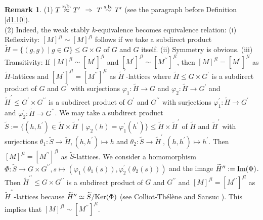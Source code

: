 \documentclass{amsart}
\theoremstyle{plain}
\theoremstyle{definition}
\newtheorem{remark}[theorem]{Remark}
\theoremstyle{remark}
\newcounter{sub}\def\tr{\mbox{tr }}
\begin{document}
%
\begin{remark}\label{r1.11}
(1) $T\stackrel{\rm s.b.}{\approx} T^\prime$ $\Rightarrow$ 
$T\stackrel{\rm s.b.}{\sim} T^\prime$ 
(see the paragraph before Definition \ref{d1.10}).\\
%
(2) 
Indeed, the weak stably $k$-equivalence becomes 
equivalence relation: 
(i) Reflexivity: $[M]^{fl}\sim [M]^{fl}$ follows 
if we take a subdirect product 
$\widetilde{H}=\{(g,g)\mid g\in G\}\leq G\times G$ of $G$ and $G$ itself. 
(ii) Symmetry is obvious. 
(iii) Transitivity: 
If $[M]^{fl}\sim [M^\prime]^{fl}$ and 
$[M^\prime]^{fl}\sim [M^{\prime\prime}]^{fl}$, 
then $[M]^{fl}=[M^\prime]^{fl}$ as $\widetilde{H}$-lattices 
and $[M^\prime]^{fl}=[M^{\prime\prime}]^{fl}$ 
as $\widetilde{H}^\prime$-lattices 
where $\widetilde{H}\leq G\times G^\prime$ is 
a subdirect product of $G$ and $G^\prime$ 
with surjections 
$\varphi_1:\widetilde{H}\rightarrow G$ and 
$\varphi_2:\widetilde{H}\rightarrow G^\prime$ 
and  
$\widetilde{H}^\prime\leq G^\prime\times G^{\prime\prime}$ is 
a subdirect product of $G^\prime$ and $G^{\prime\prime}$ 
with surjections 
$\varphi^\prime_1:\widetilde{H}\rightarrow G^\prime$ and 
$\varphi^\prime_2:\widetilde{H}\rightarrow G^{\prime\prime}$. 
We may take a subdirect product 
$\widetilde{S}:=\{(h,h^\prime)\in\widetilde{H}\times\widetilde{H}^\prime\mid 
\varphi_2(h)=\varphi^\prime_1(h^\prime)\}\leq \widetilde{H}\times\widetilde{H}^\prime$ of $\widetilde{H}$ and $\widetilde{H}^\prime$ 
with surjections 
$\theta_1: \widetilde{S}\rightarrow \widetilde{H}, (h,h^\prime)\mapsto h$ and 
$\theta_2: \widetilde{S}\rightarrow \widetilde{H}^\prime, (h,h^\prime)\mapsto h^\prime$. 
Then 
$[M]^{fl}=[M^{\prime\prime}]^{fl}$ as $\widetilde{S}$-lattices. 
We consider a homomorphism 
$\Phi: \widetilde{S}\rightarrow G\times G^{\prime\prime}, 
s\mapsto (\varphi_1(\theta_1(s)),\varphi_2^\prime(\theta_2(s)))$ 
and the image $\widetilde{H}^{\prime\prime}:={\rm Im}(\Phi)$. 
Then $\widetilde{H}^{\prime\prime}\leq G\times G^{\prime\prime}$ 
is a subdirect product of $G$ and $G^{\prime\prime}$ 
and $[M]^{fl}=[M^{\prime\prime}]^{fl}$ as 
$\widetilde{H}^{\prime\prime}$-lattices because 
$\widetilde{H}^{\prime\prime}\simeq \widetilde{S}/{\rm Ker}(\Phi)$
(see Colliot-Th\'el\`ene and Sansuc \cite[Lemme 2 (i), (ix)]{CTS77}). 
This implies that $[M]^{fl}\sim [M^{\prime\prime}]^{fl}$. 
\end{remark} 
%
\end{document}
